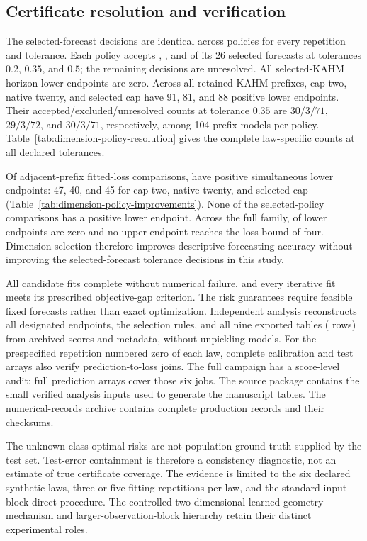 



\subsection{Certificate resolution and verification}




The selected-forecast decisions are identical across policies for every
repetition and tolerance. Each policy accepts \DimAcceptLow{}, \DimAcceptMedium{},
and \DimAcceptHigh{} of its 26 selected forecasts at tolerances
$0.2$, $0.35$, and $0.5$; the remaining decisions are unresolved.
All \DimSelectedLowerZero{} selected-KAHM horizon lower endpoints are zero.
Across all retained KAHM prefixes, cap two, native twenty, and selected cap
have 91, 81, and 88 positive lower endpoints. Their accepted/excluded/unresolved
counts at tolerance $0.35$ are $30/3/71$, $29/3/72$, and $30/3/71$,
respectively, among 104 prefix models per policy.
Table~\ref{tab:dimension-policy-resolution} gives the complete law-specific
counts at all declared tolerances.

Of \DimPrefixTails{} adjacent-prefix fitted-loss comparisons,
\DimPositivePrefix{} have positive simultaneous lower endpoints: 47, 40,
and 45 for cap two, native twenty, and selected cap
(Table~\ref{tab:dimension-policy-improvements}). None of the
\DimPolicyTails{} selected-policy comparisons has a positive lower endpoint.
Across the full family, \DimAllLowerZero{} of \DimAllLowerCount{} lower
endpoints are zero and no upper endpoint reaches the loss bound of four.
Dimension selection therefore improves descriptive forecasting accuracy
without improving the selected-forecast tolerance decisions in this study.

All candidate fits complete without numerical failure, and every iterative
fit meets its prescribed objective-gap criterion. The risk guarantees require
feasible fixed forecasts rather than exact optimization. Independent analysis
reconstructs all \DimTotalTails{} designated endpoints, the selection rules,
and all nine exported tables (\DimAuditTableRows{} rows) from archived
scores and metadata, without unpickling models. For the prespecified
repetition numbered zero of each law, complete calibration and test arrays
also verify \DimAuditPredictionJoins{} prediction-to-loss joins. The full
campaign has a score-level audit; full prediction arrays cover those six jobs.
The source package contains the small verified analysis inputs used to
generate the manuscript tables. The numerical-records archive contains
complete production records and their checksums.

The unknown class-optimal risks are not population ground truth supplied by
the test set. Test-error containment is therefore a consistency diagnostic,
not an estimate of true certificate coverage. The evidence is limited to the
six declared synthetic laws, three or five fitting repetitions per law, and
the standard-input block-direct procedure. The controlled two-dimensional
learned-geometry mechanism and larger-observation-block hierarchy retain
their distinct experimental roles.
